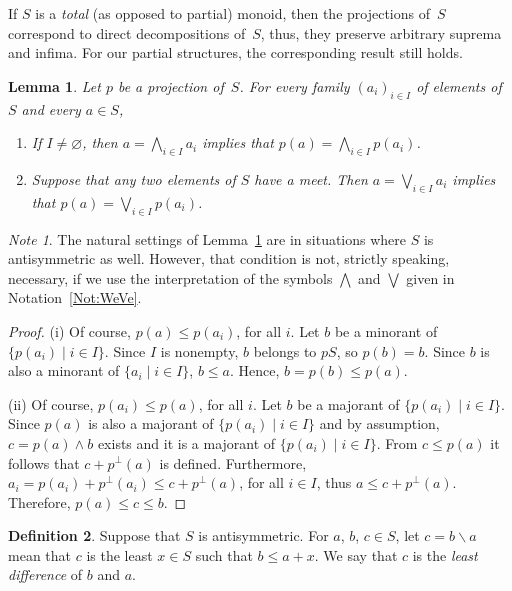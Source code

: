 \documentclass[psamsfonts,reqno]{memo-l}
\theoremstyle{plain}
\newtheorem{lemma}{Lemma}[section]
\theoremstyle{definition}
\newtheorem{definition}[lemma]{Definition}
\theoremstyle{remark}
\newtheorem*{note}{Note}
\numberwithin{equation}{section}
\newcommand{\es}{\varnothing}
\newcommand{\sd}{\smallsetminus}
\newcommand{\set}[1]{\{#1\}}
\newcommand{\setm}[2]{\set{#1\mid#2}}
\newcommand{\famm}[2]{(#1)_{#2}}
\begin{document}
If $S$ is a \emph{total} (as opposed to partial) monoid, then the
projections of~$S$ correspond to direct decompositions of~$S$, thus, they
preserve arbitrary suprema and infima. For our partial structures, the
corresponding result still holds.

\begin{lemma}\label{L:ProjCont}
Let $p$ be a projection of~$S$. For every family $\famm{a_i}{i\in I}$
of elements of~$S$ and every $a\in S$,
\begin{enumerate}
\item If $I\ne\es$, then $a=\bigwedge_{i\in I}a_i$ implies that
$p(a)=\bigwedge_{i\in I}p(a_i)$.

\item Suppose that any two elements of $S$ have a meet. Then
$a=\bigvee_{i\in I}a_i$ implies that $p(a)=\bigvee_{i\in I}p(a_i)$.
\end{enumerate}
\end{lemma}

\begin{note}
The natural settings of Lemma~\ref{L:ProjCont} are in situations where $S$ is
antisymmetric as well. However, that condition is not, strictly speaking,
necessary, if we use the interpretation of the symbols $\bigwedge$ and
$\bigvee$ given in Notation~\ref{Not:WeVe}.

\end{note}

\begin{proof}
(i) Of course, $p(a)\leq p(a_i)$, for all $i$. Let $b$ be a minorant of
$\setm{p(a_i)}{i\in I}$. Since $I$ is nonempty, $b$ belongs to $pS$, so
$p(b)=b$. Since $b$ is also a minorant of $\setm{a_i}{i\in I}$, $b\leq a$.
Hence, $b=p(b)\leq p(a)$.

(ii) Of course, $p(a_i)\leq p(a)$, for all $i$. Let $b$ be a majorant of
$\setm{p(a_i)}{i\in I}$. Since $p(a)$ is also a majorant of
$\setm{p(a_i)}{i\in I}$ and by assumption, $c=p(a)\wedge b$ exists and it is
a majorant of $\setm{p(a_i)}{i\in I}$. {}From $c\leq p(a)$ it follows that
$c+p^\bot(a)$ is defined. Furthermore,
$a_i=p(a_i)+p^\bot(a_i)\leq c+p^\bot(a)$, for all $i\in I$, thus
$a\leq c+p^\bot(a)$. Therefore, $p(a)\leq c\leq b$.
\end{proof}

\begin{definition}\label{D:LsDiff}
Suppose that $S$ is antisymmetric. For $a$, $b$, $c\in S$, let $c=b\sd a$
\index{cabszzmsms@$c=b\sd a$|ii}
mean that $c$ is the least $x\in S$ such that $b\leq a+x$. We say that $c$ is
the \emph{least difference} of $b$ and $a$.
\end{definition}
\end{document}
